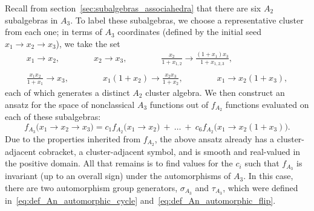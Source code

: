 \documentclass[11pt]{article}
\begin{document}
Recall from section~\ref{sec:subalgebras_associahedra} that there are six $A_2$ subalgebras in $A_3$. To label these subalgebras, we choose a representative cluster from each one; in terms of $A_3$ coordinates (defined by the initial seed $x_1 \to x_2 \to x_3$), we take the set
\begin{equation}\label{eq:a2-in-a3}
\begin{gathered}
	x_1 \longrightarrow x_2, \qquad \qquad
	x_2 \longrightarrow x_3, \qquad \qquad
	\frac{x_2}{1+x_{1,2}} \longrightarrow \frac{\left(1+x_1\right) x_3}{1+x_{1,2,3}},\\ \\
	\frac{x_1 x_2}{1+x_1} \longrightarrow x_3,\qquad \qquad
	x_1 \left(1+x_2\right) \longrightarrow \frac{x_2 x_3}{1+x_2},\qquad \qquad
	 x_1 \longrightarrow x_2 \left(1+x_3\right),
\end{gathered}	
\end{equation}
each of which generates a distinct $A_2$ cluster algebra. We then construct an ansatz for the space of nonclassical $A_3$ functions out of $f_{A_2}$ functions evaluated on each of these subalgebras:
\begin{equation}\label{eq:fa3-ansatz}
	f_{A_3}\big(x_1\to x_2\to x_3 \big) = c_1 f_{A_2}\big(x_1 \to x_2\big) \ +\ \ldots \ +\ c_6 f_{A_2}\big(x_1\to x_2 \left(1+x_3\right)\big). 
\end{equation}	
Due to the properties inherited from $f_{A_2}$, the above ansatz already has a cluster-adjacent cobracket, a cluster-adjacent symbol, and is smooth and real-valued in the positive domain. All that remains is to find values for the $c_i$ such that $f_{A_3}$ is invariant (up to an overall sign) under the automorphisms of $A_3$. In this case, there are two automorphism group generators, $\sigma_{A_3}$ and $\tau_{A_3}$, which were defined in~\eqref{eq:def_An_automorphic_cycle} and~\eqref{eq:def_An_automorphic_flip}.  
\end{document}
